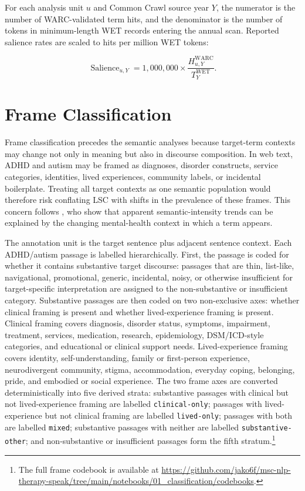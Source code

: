 For each analysis unit \(u\) and Common Crawl source year \(Y\), the numerator is the number of WARC-validated term hits, and the denominator is the number of tokens in minimum-length WET records entering the annual scan. Reported salience rates are scaled to hits per million WET tokens:

\begin{equation}
\operatorname{Salience}_{u,Y}
=
1{,}000{,}000
\times
\frac{H^{\operatorname{WARC}}_{u,Y}}{T^{\operatorname{WET}}_Y}.
\end{equation}

\section{Frame Classification}
\label{sec:methods-frame-classification}

Frame classification precedes the semantic analyses because target-term contexts may change not only in meaning but also in discourse composition. In web text, ADHD and autism may be framed as diagnoses, disorder constructs, service categories, identities, lived experiences, community labels, or incidental boilerplate. Treating all target contexts as one semantic population would therefore risk conflating LSC with shifts in the prevalence of these frames. This concern follows \citet{pislRevisitingSemanticSeverity2025}, who show that apparent semantic-intensity trends can be explained by the changing mental-health context in which a term appears.

The annotation unit is the target sentence plus adjacent sentence context. Each ADHD/autism passage is labelled hierarchically. First, the passage is coded for whether it contains substantive target discourse: passages that are thin, list-like, navigational, promotional, generic, incidental, noisy, or otherwise insufficient for target-specific interpretation are assigned to the non-substantive or insufficient category. Substantive passages are then coded on two non-exclusive axes: whether clinical framing is present and whether lived-experience framing is present. Clinical framing covers diagnosis, disorder status, symptoms, impairment, treatment, services, medication, research, epidemiology, DSM/ICD-style categories, and educational or clinical support needs. Lived-experience framing covers identity, self-understanding, family or first-person experience, neurodivergent community, stigma, accommodation, everyday coping, belonging, pride, and embodied or social experience. The two frame axes are converted deterministically into five derived strata: substantive passages with clinical but not lived-experience framing are labelled \texttt{clinical-only}; passages with lived-experience but not clinical framing are labelled \texttt{lived-only}; passages with both are labelled \texttt{mixed}; substantive passages with neither are labelled \texttt{substantive-other}; and non-substantive or insufficient passages form the fifth stratum.\footnote{The full frame codebook is available at \url{https://github.com/jako6f/msc-nlp-therapy-speak/tree/main/notebooks/01_classification/codebooks}.}

